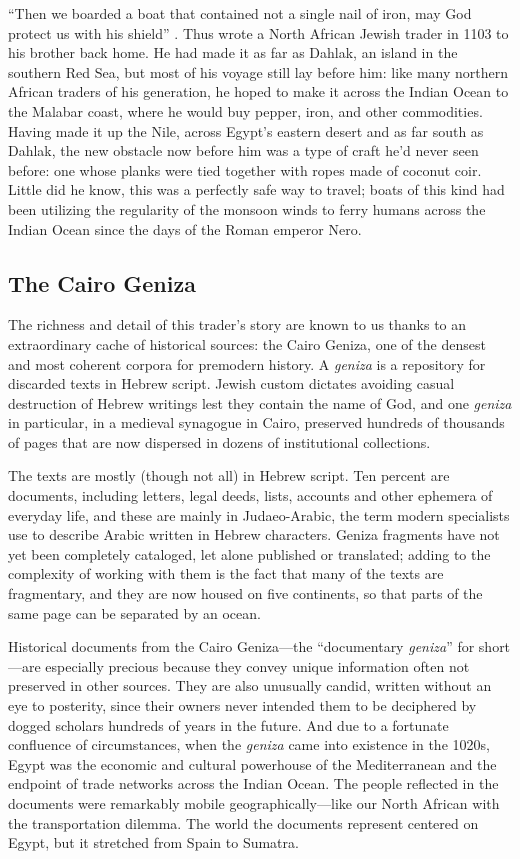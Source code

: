 \documentclass{article}
\begin{document}
“Then we boarded a boat that contained not a single nail of iron, may God protect us with his shield” \autocite{noauthor_letter_1103}. Thus wrote a North African Jewish trader in 1103 to his brother back home. He had made it as far as Dahlak, an island in the southern Red Sea, but most of his voyage still lay before him: like many northern African traders of his generation, he hoped to make it across the Indian Ocean to the Malabar coast, where he would buy pepper, iron, and other commodities. Having made it up the Nile, across Egypt’s eastern desert and as far south as Dahlak, the new obstacle now before him was a type of craft he’d never seen before: one whose planks were tied together with ropes made of coconut coir. Little did he know, this was a perfectly safe way to travel; boats of this kind had been utilizing the regularity of the monsoon winds to ferry humans across the Indian Ocean since the days of the Roman emperor Nero.

\subsection{The Cairo Geniza}

The richness and detail of this trader’s story are known to us thanks to an extraordinary cache of historical sources: the Cairo Geniza, one of the densest and most coherent corpora for premodern history. A \textit{geniza} is a repository for discarded texts in Hebrew script. Jewish custom dictates avoiding casual destruction of Hebrew writings lest they contain the name of God, and one \textit{geniza} in particular, in a medieval synagogue in Cairo, preserved hundreds of thousands of pages that are now dispersed in dozens of institutional collections. 

The texts are mostly (though not all) in Hebrew script. Ten percent are documents, including letters, legal deeds, lists, accounts and other ephemera of everyday life, and these are mainly in Judaeo-Arabic, the term modern specialists use to describe Arabic written in Hebrew characters. Geniza fragments have not yet been completely cataloged, let alone published or translated; adding to the complexity of working with them is the fact that many of the texts are fragmentary, and they are now housed on five continents, so that parts of the same page can be separated by an ocean.

Historical documents from the Cairo Geniza—the “documentary \textit{geniza}” for short—are especially precious because they convey unique information often not preserved in other sources. They are also unusually candid, written without an eye to posterity, since their owners never intended them to be deciphered by dogged scholars hundreds of years in the future. And due to a fortunate confluence of circumstances, when the \textit{geniza} came into existence in the 1020s, Egypt was the economic and cultural powerhouse of the Mediterranean and the endpoint of trade networks across the Indian Ocean. The people reflected in the documents were remarkably mobile geographically—like our North African with the transportation dilemma. The world the documents represent centered on Egypt, but it stretched from Spain to Sumatra. 
\end{document}

